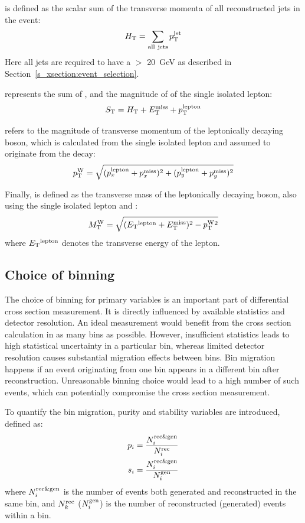 \HT is defined as the scalar sum of the transverse momenta of all reconstructed jets in the event:
\[H_{\mathrm{T}} = \sum_{\mathrm{all~jets}}p_{\mathrm{T}}^{\mathrm{jet}}\]
Here all jets are required to have a \pt $>$ \SI{20}{\GeV} as described in Section~\ref{s_xsection:event_selection}.

\ST represents the sum of \HT, \MET and the magnitude of \pt of the single isolated lepton:
\[S_{\mathrm{T}} = H_{\mathrm{T}} + E_{\mathrm{T}}^{\textrm{miss}} + p_\mathrm{T}^\mathrm{lepton}\]

\WPT refers to the magnitude of transverse momentum of the leptonically decaying \W boson, which is calculated from the
single isolated lepton and \MET assumed to originate from the \ttbar decay:
\[p_\mathrm{T}^{\mathrm{W}} = \sqrt{(p_x^{\mathrm{lepton}} + p_x^{\mathrm{miss}})^2 + (p_y^{\mathrm{lepton}} + p_y^{\mathrm{miss}})^2}\]

Finally, \MT is defined as the transverse mass of the leptonically decaying \W boson, also using the single isolated
lepton and \MET:
\[M_\mathrm{T}^{\mathrm{W}} = \sqrt{(E_{\mathrm{T}} {}^{\mathrm{lepton}} +E_{\mathrm{T}}^{\textrm{miss}})^2 - p_\mathrm{T}^{\mathrm{W}} {}^2}\]
where $E_{\mathrm{T}} {}^{\mathrm{lepton}}$ denotes the transverse energy of the lepton.

\subsection{Choice of binning}
\label{ss_xsection:binning}

The choice of binning for primary variables is an important part of differential cross section measurement. It is
directly influenced by available statistics and detector resolution. An ideal measurement would benefit from the cross
section calculation in as many bins as possible. However, insufficient statistics leads to high statistical uncertainty
in a particular bin, whereas limited detector resolution causes substantial migration effects between bins. Bin
migration happens if an event originating from one bin appears in a different bin after reconstruction. Unreasonable
binning choice would lead to a high number of such events, which can potentially compromise the cross section
measurement.

To quantify the bin migration, purity and stability variables are introduced, defined as:
\begin{align}
p_i = \frac{N^{\mathrm{rec}\&\mathrm{gen}}_i}{N^{\mathrm{rec}}_i} \\
s_i = \frac{N^{\mathrm{rec}\&\mathrm{gen}}_i}{N^{\mathrm{gen}}_i}
\end{align}
where $N^{\mathrm{rec}\&\mathrm{gen}}_i$ is the number of events both generated and reconstructed in the same bin, and
$N^{\mathrm{rec}}_k$ ($N^{\mathrm{gen}}_i$) is the number of reconstructed (generated) events within a bin.

